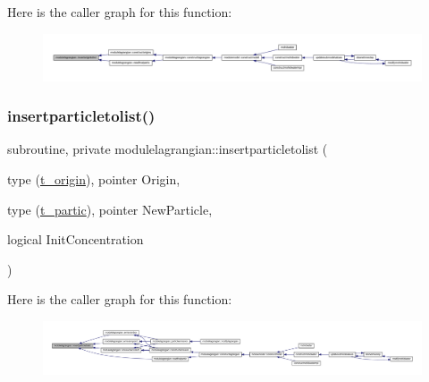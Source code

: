 Here is the caller graph for this function\+:\nopagebreak
\begin{figure}[H]
\begin{center}
\leavevmode
\includegraphics[width=350pt]{namespacemodulelagrangian_a842c38bc1af98cfe321b3cd2eca5aa14_icgraph}
\end{center}
\end{figure}
\mbox{\label{namespacemodulelagrangian_a96b3fbaf01697148bac38553d6198dc3}} 
\subsubsection{\texorpdfstring{insertparticletolist()}{insertparticletolist()}}
{\footnotesize\ttfamily subroutine, private modulelagrangian\+::insertparticletolist (\begin{DoxyParamCaption}\item[{type (\mbox{\hyperlink{structmodulelagrangian_1_1t__origin}{t\+\_\+origin}}), pointer}]{Origin,  }\item[{type (\mbox{\hyperlink{structmodulelagrangian_1_1t__partic}{t\+\_\+partic}}), pointer}]{New\+Particle,  }\item[{logical}]{Init\+Concentration }\end{DoxyParamCaption})\hspace{0.3cm}{\ttfamily [private]}}

Here is the caller graph for this function\+:\nopagebreak
\begin{figure}[H]
\begin{center}
\leavevmode
\includegraphics[width=350pt]{namespacemodulelagrangian_a96b3fbaf01697148bac38553d6198dc3_icgraph}
\end{center}
\end{figure}
\mbox{\label{namespacemodulelagrangian_ad3e2ea0ce974a102fea039aef69c4626}} 
